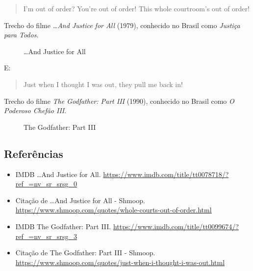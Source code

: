 \begin{quote}
I'm out of order? You're out of order! This whole courtroom's out of
order!
\end{quote}

Trecho do filme \emph{\ldots And Justice for All} (1979), conhecido no
Brasil como \emph{Justiça para Todos}.

\begin{figure}
  \centering
    \caption{…And Justice for All\label{fig:and-justice-for-all}}
\end{figure}

E:

\begin{quote}
Just when I thought I was out, they pull me back in!
\end{quote}

Trecho do filme \emph{The Godfather: Part III} (1990), conhecido no
Brasil como \emph{O Poderoso Chefão III}.

\begin{figure}
  \centering
    \caption{The Godfather: Part III\label{fig:the-godfather-part-iii}}
\end{figure}

\hypertarget{referuxeancias-3}{%
\subsection{Referências}\label{referuxeancias-3}}

\begin{itemize}
\tightlist
\item
  \sloppy IMDB …And Justice for All. \url{https://www.imdb.com/title/tt0078718/?ref_=nv_sr_srsg_0}
\item
  \sloppy Citação de …And Justice for All - Shmoop. \url{https://www.shmoop.com/quotes/whole-courts-out-of-order.html}
\item
  \sloppy IMDB The Godfather: Part III. \url{https://www.imdb.com/title/tt0099674/?ref_=nv_sr_srsg_3}
\item
  \sloppy Citação de The Godfather: Part III - Shmoop. \url{https://www.shmoop.com/quotes/just-when-i-thought-i-was-out.html}
\end{itemize}


